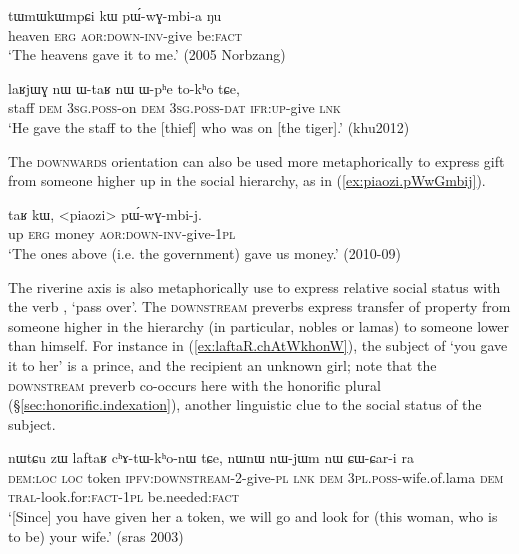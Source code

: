 \begin{exe}
\ex \label{ex:pWwGmbia}
\gll tɯmɯkɯmpɕi kɯ pɯ́-wɣ-mbi-a ŋu \\
heaven \textsc{erg} \textsc{aor}:\textsc{down}-\textsc{inv}-give be:\textsc{fact} \\
\glt `The heavens gave it to me.' (2005 Norbzang)
\end{exe}

\begin{exe}
\ex \label{ex:Wphe.tokho}
\gll laʁjɯɣ nɯ ɯ-taʁ nɯ ɯ-pʰe to-kʰo tɕe,  \\
staff \textsc{dem} \textsc{3sg}.\textsc{poss}-on \textsc{dem} \textsc{3sg}.\textsc{poss}-\textsc{dat} \textsc{ifr}:\textsc{up}-give \textsc{lnk} \\
\glt `He gave the staff to the [thief] who was on [the tiger].' (khu2012)
\end{exe}

The \textsc{downwards} orientation can also be used more metaphorically to express gift from someone higher up in the social hierarchy, as in (\ref{ex:piaozi.pWwGmbij}).

\begin{exe}
\ex \label{ex:piaozi.pWwGmbij}
\gll  taʁ kɯ, <piaozi> pɯ́-wɣ-mbi-j. \\
up \textsc{erg} money \textsc{aor}:\textsc{down}-\textsc{inv}-give-\textsc{1pl}  \\
\glt  `The ones above (i.e. the government) gave us money.' (2010-09)
\end{exe}

The riverine axis is also metaphorically use to express relative social status with the verb , `pass over'. The \textsc{downstream} preverbs express transfer of property from someone higher in the hierarchy (in particular, nobles or lamas) to someone lower than himself. For instance in (\ref{ex:laftaR.chAtWkhonW}), the subject of  `you gave it to her' is a prince, and the recipient an unknown girl; note that the \textsc{downstream} preverb co-occurs here with the honorific plural (§\ref{sec:honorific.indexation}), another linguistic clue to the social status of the subject.

\begin{exe}
\ex \label{ex:laftaR.chAtWkhonW}
\gll nɯtɕu zɯ laftaʁ cʰɤ-tɯ-kʰo-nɯ tɕe, nɯnɯ nɯ-jɯm nɯ ɕɯ-ɕar-i ra \\
\textsc{dem}:\textsc{loc} \textsc{loc} token \textsc{ipfv}:\textsc{downstream}-2-give-\textsc{pl} \textsc{lnk} \textsc{dem} \textsc{3pl}.\textsc{poss}-wife.of.lama \textsc{dem} \textsc{tral}-look.for:\textsc{fact}-\textsc{1pl} be.needed:\textsc{fact} \\
\glt `[Since] you have given her a token, we will go and look for (this woman, who is to be) your wife.' (sras 2003)
\end{exe}

